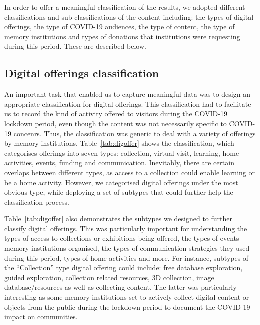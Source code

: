 \documentclass{egpubl}
\begin{document}
In order to offer a meaningful classification of the results, we adopted different classifications and sub-classifications of the content including: the types of digital offerings, the type of COVID-19 audiences, the type of content, the type of memory institutions and types of donations that institutions were requesting during this period. These are described below.

\subsection{Digital offerings classification}
\label{off}
An important task that enabled us to capture meaningful data was to design an appropriate classification for digital offerings. This classification had to facilitate us to record the kind of activity offered to visitors during the COVID-19 lockdown period, even though the content was not necessarily specific to COVID-19 concenrs. Thus, the classification was generic to deal with a variety of offerings by memory institutions. Table~\ref{tab:digoffer} shows the classification, which categorises offerings into seven types: collection, virtual visit, learning, home activities, events, funding and communication. Inevitably, there are certain overlaps between different types, as access to a collection could enable learning or be a home activity. However, we categorised digital offerings %
under the most obvious type, while deploying a set of subtypes that could further help the classification process.

Table~\ref{tab:digoffer} also demonstrates the subtypes we designed to further classify digital offerings. This was particularly important for understanding the types of access to collections or exhibitions being offered, the types of events memory institutions organised, the types of communication strategies they used during this period, types of home activities and more. For instance, subtypes of the ``Collection'' type digital offering could include: free database exploration, guided exploration, collection related resources, 3D collection, image database/resources as well as collecting content. The latter was particularly interesting as some memory institutions set to actively collect digital content or objects from the public during the lockdown period to document the COVID-19 impact on communities.
\end{document}
